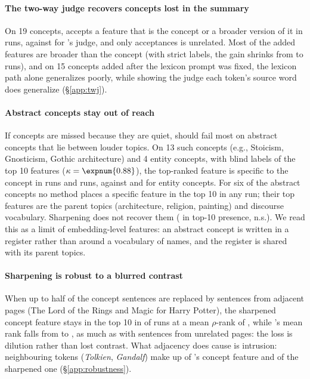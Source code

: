 \paragraph{The two-way judge recovers concepts lost in the summary}
On 19 concepts, \twj{} accepts a feature that is the concept or a broader version of it in  runs, against  for \ember{}'s judge, and only  acceptances is unrelated.
Most of the added features are broader than the concept (with strict labels, the gain shrinks from  to  runs), and on 15 concepts added after the lexicon prompt was fixed, the lexicon path alone generalizes poorly, while showing the judge each token's source word does generalize (\S\ref{app:twj}).

\paragraph{Abstract concepts stay out of reach}
If concepts are missed because they are quiet, \ember{} should fail most on abstract concepts that lie between louder topics.
On 13 such concepts (e.g., Stoicism, Gnosticism, Gothic architecture) and 4 entity concepts, with blind labels of the top 10 features ($\kappa = \expnum{0.88}$), the top-ranked feature is specific to the concept in  \ember{} runs and  \cs{} runs, against  and  for entity concepts.
For six of the abstract concepts no method places a specific feature in the top 10 in any run; their top features are the parent topics (architecture, religion, painting) and discourse vocabulary.
Sharpening does not recover them ( in top-10 presence, n.s.).
We read this as a limit of embedding-level features: an abstract concept is written in a register rather than around a vocabulary of names, and the register is shared with its parent topics.

\paragraph{Sharpening is robust to a blurred contrast}
When up to half of the concept sentences are replaced by sentences from adjacent pages (The Lord of the Rings and Magic for Harry Potter), the sharpened concept feature stays in the top 10 in  of runs at a mean $\rho$-rank of , while \ember{}'s mean rank falls from  to , as much as with sentences from unrelated pages: the loss is dilution rather than lost contrast.
What adjacency does cause is intrusion: neighbouring tokens (\emph{Tolkien}, \emph{Gandalf}) make up  of \ember{}'s concept feature and  of the sharpened one (\S\ref{app:robustness}).

